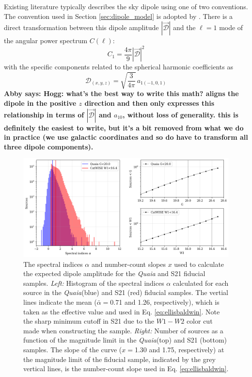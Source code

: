 \documentclass[modern]{aastex631}
\newcommand{\abby}[1]{\textbf{Abby says: #1}}
\newcommand{\quaia}{\textsl{Quaia}\xspace}
\begin{document}
Existing literature typically describes the sky dipole using one of two conventions.
The convention used in Section \ref{sec:dipole_model} is adopted by \citet{secrest_test_2021}.
There is a direct transformation between this dipole amplitude $|\vec{\mathcal{D}}|$ and the $\ell=1$ mode of the angular power spectrum $C(\ell)$:
\begin{equation}
    C_1 = \frac{4\pi}{9}|\vec{\mathcal{D}}|^2
\end{equation}
with the specific components related to the spherical harmonic coefficients as
\begin{equation}
    \mathcal{D}_{(x,y,z)} = \sqrt{\frac{3}{4\pi}}\,a_{1(-1,0,1)}
\end{equation}
\abby{Hogg: what's the best way to write this math? \citet{gibelyou_dipoles_2012} aligns the dipole in the positive $z$ direction and then only expresses this relationship in terms of $|\vec{\mathcal{D}}|$ and $a_{10}$, without loss of generality. this is definitely the easiest to write, but it's a bit removed from what we do in practice (we use galactic coordinates and so do have to transform all three dipole components).}

\begin{figure}
    \centering
    \includegraphics[width=\textwidth]{images/alphas_xs_G20.5.png}
    \caption{The spectral indices $\alpha$ and number-count slopes $x$ used to calculate the expected dipole amplitude for the \quaia and S21 fiducial samples. \textit{Left:} Histogram of the spectral indices $\alpha$ calculated for each source in the \quaia (blue) and S21 (red) fiducial samples. The vertial lines indicate the mean ($\bar\alpha=$0.71 and 1.26, respectively), which is taken as the effective value and used in Eq. \ref{eq:ellisbaldwin}. Note the sharp minimum cutoff in S21 due to the $W1-W2$ color cut made when constructing the sample. \textit{Right:} Number of sources as a function of the magnitude limit in the \quaia (top) and S21 (bottom) samples. The slope of the curve ($x=$1.30 and 1.75, respectively) at the magnitude limit of the fiducial sample, indicated by the grey vertical lines, is the number-count slope used in Eq. \ref{eq:ellisbaldwin}.}
    \label{fig:alphas_xs}
\end{figure}
\end{document}
